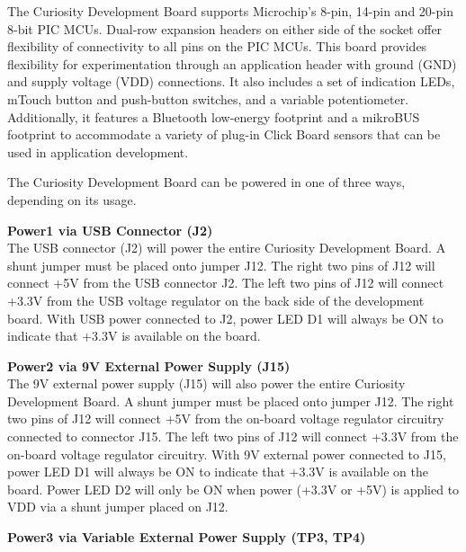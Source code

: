 The Curiosity Development Board supports Microchip's 8-pin, 14-pin and 20-pin 8-bit PIC MCUs. Dual-row expansion headers on either side of the socket offer flexibility of connectivity to all pins on the PIC MCUs. This board provides flexibility for 
experimentation through an application header with ground (GND) and supply voltage (VDD) connections. It also includes
a set of indication LEDs, mTouch button and push-button switches, and a variable potentiometer. Additionally, it features a 
Bluetooth low-energy footprint and a mikroBUS footprint to accommodate a variety of plug-in Click Board sensors that can be used in application development.
\vspace{0.5cm}

The Curiosity Development Board can be powered in one of three ways, depending on its usage.
\vspace{0.5cm}

\textbf{Power1 via USB Connector (J2)}\\

The USB connector (J2) will power the entire Curiosity Development Board. A shunt jumper must be placed onto jumper J12. The right two pins of J12 will connect +5V from the USB connector J2. The left two pins of J12 will connect +3.3V from the USB voltage regulator on the back side of the development board. With USB power connected to J2, power LED D1 will always be ON to indicate that +3.3V is available on the board. 
\vspace{0.5cm}

\textbf{Power2 via 9V External Power Supply (J15)}\\

The 9V external power supply (J15) will also power the entire Curiosity Development Board. A shunt jumper must be placed onto jumper J12. The right two pins of J12 will connect +5V from the on-board voltage regulator circuitry connected to connector J15. The left two pins of J12 will connect +3.3V from the on-board voltage regulator circuitry. With 9V external power connected to J15, power LED D1 will always be ON to indicate that +3.3V is available on the board. Power LED D2 will only be ON when power (+3.3V or +5V) is applied to VDD via a shunt jumper placed on J12.
\vspace{0.5cm}

\textbf{Power3 via Variable External Power Supply (TP3, TP4)}\\

